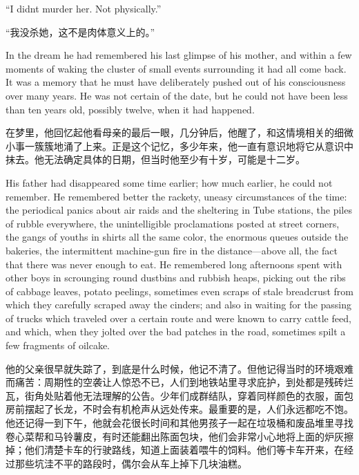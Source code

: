 \begin{paracol}{2}
``I didn\textquotesingle t murder her. Not physically.''

\switchcolumn

``我没杀她，这不是肉体意义上的。''

\switchcolumn*

In the dream he had remembered his last glimpse of his mother, and
within a few moments of waking the cluster of small events surrounding
it had all come back. It was a memory that he must have deliberately
pushed out of his consciousness over many years. He was not certain of
the date, but he could not have been less than ten years old, possibly
twelve, when it had happened.

\switchcolumn

在梦里，他回忆起他看母亲的最后一眼，几分钟后，他醒了，和这情境相关的细微小事一簇簇地涌了上来。正是这个记忆，多少年来，他一直有意识地将它从意识中抹去。他无法确定具体的日期，但当时他至少有十岁，可能是十二岁。

\switchcolumn*

His father had disappeared some time earlier; how much earlier, he could
not remember. He remembered better the rackety, uneasy circumstances of
the time: the periodical panics about air raids and the sheltering in
Tube stations, the piles of rubble everywhere, the unintelligible
proclamations posted at street corners, the gangs of youths in shirts
all the same color, the enormous queues outside the bakeries, the
intermittent machine-gun fire in the distance---above all, the fact that
there was never enough to eat. He remembered long afternoons spent with
other boys in scrounging round dustbins and rubbish heaps, picking out
the ribs of cabbage leaves, potato peelings, sometimes even scraps of
stale breadcrust from which they carefully scraped away the cinders; and
also in waiting for the passing of trucks which traveled over a certain
route and were known to carry cattle feed, and which, when they jolted
over the bad patches in the road, sometimes spilt a few fragments of
oilcake.

\switchcolumn

他的父亲很早就失踪了，到底是什么时候，他记不清了。但他记得当时的环境艰难而痛苦：周期性的空袭让人惊恐不已，人们到地铁站里寻求庇护，到处都是残砖烂瓦，街角处贴着他无法理解的公告。少年们成群结队，穿着同样颜色的衣服，面包房前摆起了长龙，不时会有机枪声从远处传来。最重要的是，人们永远都吃不饱。他还记得一到下午，他就会花很长时间和其他男孩子一起在垃圾桶和废品堆里寻找卷心菜帮和马铃薯皮，有时还能翻出陈面包块，他们会非常小心地将上面的炉灰擦掉；他们清楚卡车的行驶路线，知道上面装着喂牛的饲料。他们等卡车开来，在经过那些坑洼不平的路段时，偶尔会从车上掉下几块油糕。


\end{paracol}
